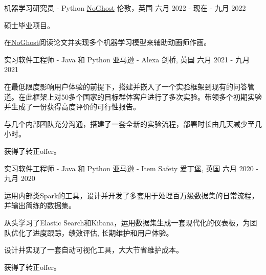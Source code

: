 

\begin{cventries}

    \cventry
    {机器学习研究员 - Python} %
    {\href{https://www.noghost.co.uk/}{NoGhost}} %
    {伦敦，英国} %
    {六月 2022 - 现在 - 九月 2022} %
    {
      \begin{cvitems} %
        \item {硕士毕业项目。}
        \item {在\href{https://www.noghost.co.uk/}{NoGhost}阅读论文并实现多个机器学习模型来辅助动画师作画。}
      \end{cvitems}
    }

  \cventry
    {实习软件工程师 - Java 和 Python} %
    {亚马逊 - Alexa} %
    {剑桥, 英国} %
    {六月 2021 - 九月 2021} %
    {
      \begin{cvitems} %
        \item {在最低限度影响用户体验的前提下，搭建并嵌入了一个实验框架到现有的问答管道。在此框架上对50多个国家的目标群体客户进行了多次实验。带领多个初期实验并生成了一份获得高度评价的可行性报告。}
        \item {与几个内部团队充分沟通，搭建了一套全新的实验流程，部署时长由几天减少至几小时。}
        \item {获得了转正offer。}
      \end{cvitems}
    }

  \cventry
    {实习软件工程师 - Java 和 Python} %
    {亚马逊 - Item Safety} %
    {爱丁堡, 英国} %
    {六月 2020 - 九月 2020} %
    {
      \begin{cvitems} %
        \item {运用内部类Spark的工具，设计并开发了多套用于处理百万级数据集的日常流程，并输出简练的数据集。}
        \item {从头学习了Elastic Search和Kibana，运用数据集生成一套现代化的仪表板，为团队优化了进度跟踪，绩效评估, 长期维护和用户体验。}
        \item {设计并实现了一套自动可视化工具，大大节省维护成本。}
        \item {获得了转正offer。}
      \end{cvitems}
    }


\end{cventries}
